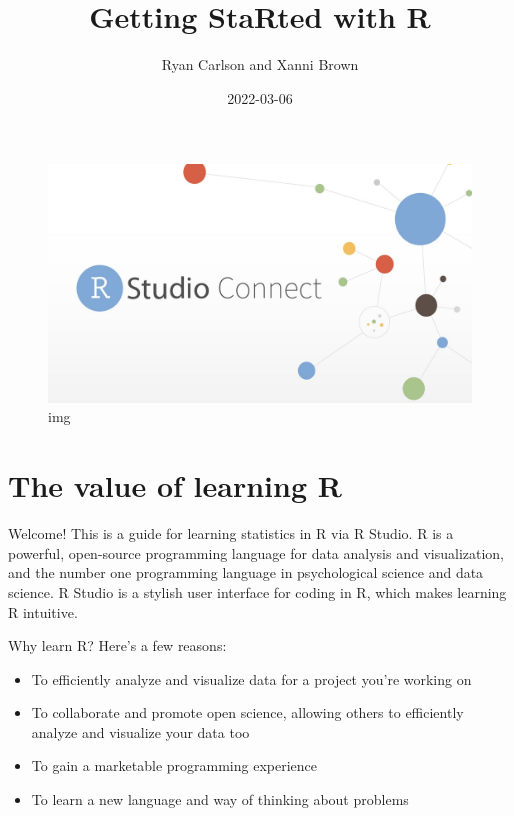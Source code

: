 \documentclass[
]{book}
\title{Getting StaRted with R}
\author{Ryan Carlson and Xanni Brown}
\date{2022-03-06}
\providecommand{\tightlist}{%
  \setlength{\itemsep}{0pt}\setlength{\parskip}{0pt}}
\begin{document}
\maketitle

{
\setcounter{tocdepth}{1}
\tableofcontents
}
\begin{figure}
\centering
\includegraphics{images/logo.jpeg}
\caption{img}
\end{figure}

\hypertarget{the-value-of-learning-r}{%
\chapter{The value of learning R}\label{the-value-of-learning-r}}

Welcome! This is a guide for learning statistics in R via R Studio. R is a powerful, open-source programming language for data analysis and visualization, and the number one programming language in psychological science and data science. R Studio is a stylish user interface for coding in R, which makes learning R intuitive.

Why learn R? Here's a few reasons:

\begin{itemize}
\tightlist
\item
  To efficiently analyze and visualize data for a project you're working on\\
\item
  To collaborate and promote open science, allowing others to efficiently analyze and visualize your data too\\
\item
  To gain a marketable programming experience\\
\item
  To learn a new language and way of thinking about problems
\end{itemize}
\end{document}
